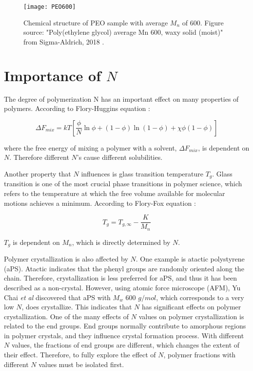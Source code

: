 \begin{figure}[H]
	\center
	\texttt{[image: PEO600]}
	\caption[Chemical structure of PEO sample with average $M_{n}$ of 600.]{Chemical structure of PEO sample with average $M_{n}$ of 600. Figure source: "Poly(ethylene glycol) average Mn 600, waxy solid (moist)" from Sigma-Aldrich, 2018 \cite{Sigma-Aldrich2018}.}
	\label{fig:PEO600}
\end{figure}

\section{Importance of $N$}

The degree of polymerization N has an important effect on many properties of polymers. According to Flory-Huggins equation \cite{Rubinstein2003}: 

\begin{equation}
\label{eqn_free energy}
\Delta F_{mix} = kT [\dfrac{\phi}{N} \ln \phi + (1 - \phi) \ln (1 - \phi) + \chi \phi (1 - \phi)]
\end{equation}

\noindent
where the free energy of mixing a polymer with a solvent, $\Delta F_{mix}$, is dependent on $N$. Therefore different $N$'s cause different solubilities. 

Another property that $N$ influences is glass transition temperature $T_{g}$. Glass transition is one of the most crucial phase transitions in polymer science, which refers to the temperature at which the free volume available for molecular motions achieves a minimum. According to Flory-Fox equation \cite{Fox1950a}:

\begin{equation}
\label{eqn_fox-flory}
T_{g} = T_{g,\infty} - \dfrac{K}{M_{n}}
\end{equation}

\noindent
$T_{g}$ is dependent on $M_{n}$, which is directly determined by $N$.

Polymer crystallization is also affected by $N$. One example is atactic polystyrene (aPS). Atactic indicates that the phenyl groups are randomly oriented along the chain. Therefore, crystallization is less preferred for aPS, and thus it has been described as a non-crystal. However, using atomic force microscope (AFM), Yu Chai \textit{et al} \cite{Chai2016} discovered that aPS with $M_{w}$ 600 $g/mol$, which corresponds to a very low $N$, does crystallize. This indicates that $N$ has significant effects on polymer crystallization. One of the many effects of $N$ values on polymer crystallization is related to the end groups. End groups normally contribute to amorphous regions in polymer crystals, and they influence crystal formation process. With different $N$ values, the fractions of end groups are different, which changes the extent of their effect. Therefore, to fully explore the effect of $N$, polymer fractions with different $N$ values must be isolated first.

